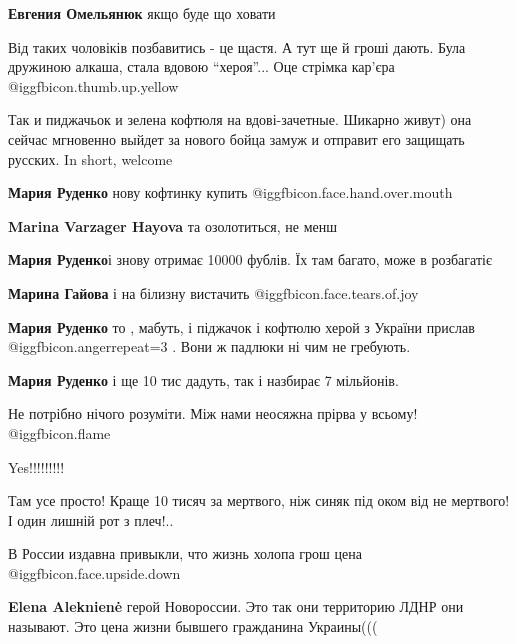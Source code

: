 \begin{itemize}
\begin{itemize}
\textbf{Евгения Омельянюк} якщо буде що ховати

\end{itemize} %


Від таких чоловіків позбавитись - це щастя. А тут ще й гроші дають. Була
дружиною алкаша, стала вдовою \enquote{хероя}... Оце стрімка кар'єра  @igg{fbicon.thumb.up.yellow} 


Так и пиджачьок и зелена кофтюля на вдові-зачетные. Шикарно живут) она сейчас
мгновенно выйдет за нового бойца замуж и отправит его защищать русских. In
short, welcome

\begin{itemize} %
\textbf{Мария Руденко} нову кофтинку купить  @igg{fbicon.face.hand.over.mouth} 

\textbf{Marina Varzager Hayova} та озолотиться, не менш

\textbf{Мария Руденко}і знову отримає 10000 фублів. Їх там багато, може в розбагатіє

\textbf{Марина Гайова} і на білизну вистачить  @igg{fbicon.face.tears.of.joy} 

\textbf{Мария Руденко} то , мабуть, і піджачок і кофтюлю херой з України прислав @igg{fbicon.anger}{repeat=3} . Вони ж падлюки ні чим не гребують.

\textbf{Мария Руденко} і ще 10 тис дадуть, так і назбирає 7 мільйонів.
\end{itemize} %

Не потрібно нічого розуміти. Між нами неосяжна прірва у всьому! 📢 @igg{fbicon.flame} 

Yes!!!!!!!!!


Там усе просто! Краще 10 тисяч за мертвого, ніж синяк під оком від не мертвого!
І один лишній рот з плеч!..

В России издавна привыкли, что жизнь холопа грош цена @igg{fbicon.face.upside.down} 

\begin{itemize} %
\textbf{Elena Aleknienė} герой Новороссии. Это так они территорию ЛДНР они называют. Это цена жизни бывшего гражданина Украины(((


\end{itemize}
\end{itemize}
